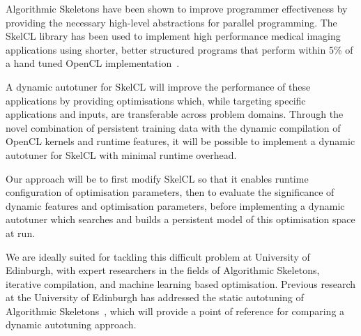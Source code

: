 Algorithmic Skeletons have been shown to improve programmer
effectiveness by providing the necessary high-level abstractions for
parallel programming. The SkelCL library has been used to implement
high performance medical imaging applications using shorter, better
structured programs that perform within 5\% of a hand tuned OpenCL
implementation~\cite{Steuwer2012}.

A dynamic autotuner for SkelCL will improve the performance of these
applications by providing optimisations which, while targeting
specific applications and inputs, are transferable across problem
domains. Through the novel combination of persistent training data
with the dynamic compilation of OpenCL kernels and runtime features,
it will be possible to implement a dynamic autotuner for SkelCL with
minimal runtime overhead.

Our approach will be to first modify SkelCL so that it enables runtime
configuration of optimisation parameters, then to evaluate the
significance of dynamic features and optimisation parameters, before
implementing a dynamic autotuner which searches and builds a
persistent model of this optimisation space at run.

We are ideally suited for tackling this difficult problem at
University of Edinburgh, with expert researchers in the fields of
Algorithmic Skeletons, iterative compilation, and machine learning
based optimisation. Previous research at the University of Edinburgh
has addressed the static autotuning of Algorithmic
Skeletons~\cite{Collins2012, Collins2013}, which will provide a point
of reference for comparing a dynamic autotuning approach.
